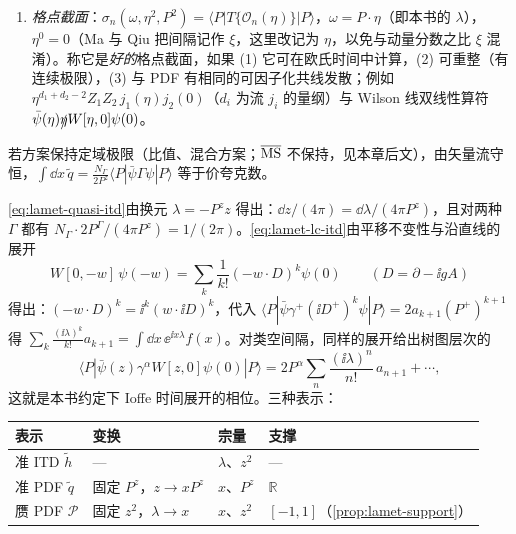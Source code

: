 \begin{definition}
\begin{enumerate}[label=(\roman*),leftmargin=2em,itemsep=1pt,topsep=2pt]
其中 $w=(0^+,w^-,\mathbf 0_{\mathrm T})$，$\lambda=P^+w^-$。
\item \emph{格点截面}\cite{MaQiu2018}：$\sigma_n(\omega,\eta^2,P^2)=\langle P|T\{\mathcal O_n(\eta)\}|P\rangle$，$\omega=P\cdot\eta$（即本书的 $\lambda$），$\eta^0=0$（Ma 与 Qiu 把间隔记作 $\xi$，这里改记为 $\eta$，以免与动量分数之比 $\xi$ 混淆）。称它是\emph{好的}格点截面，如果 (1) 它可在欧氏时间中计算，(2) 可重整（有连续极限），(3) 与 PDF 有相同的可因子化共线发散；例如 $\eta^{d_1+d_2-2}Z_1Z_2\,j_1(\eta)j_2(0)$（$d_i$ 为流 $j_i$ 的量纲）与 Wilson 线双线性算符 $\bar\psi(\eta)\slashed{\eta} W[\eta,0]\psi(0)$。
\end{enumerate}
若方案保持定域极限（比值、混合方案；$\overline{\mathrm{MS}}$ 不保持，见本章后文），由矢量流守恒，$\int\dd x\,\tilde q=\frac{N_\Gamma}{2P^z}\langle P|\bar\psi\Gamma\psi|P\rangle$ 等于价夸克数。
\end{definition}

\cref{eq:lamet-quasi-itd}由换元 $\lambda=-P^zz$ 得出：$\dd z/(4\pi)=\dd\lambda/(4\pi P^z)$，且对两种 $\Gamma$ 都有 $N_\Gamma\cdot2P^\Gamma/(4\pi P^z)=1/(2\pi)$。\cref{eq:lamet-lc-itd}由平移不变性与沿直线的展开
\[
W[0,-w]\,\psi(-w)=\sum_k\frac1{k!}(-w\cdot D)^k\psi(0)\qquad(D=\partial-\ii gA)
\]
得出：$(-w\cdot D)^k=\ii^k(w\cdot\ii D)^k$，代入 $\langle P|\bar\psi\gamma^+(\ii D^+)^k\psi|P\rangle=2a_{k+1}(P^+)^{k+1}$ 得 $\sum_k\frac{(\ii\lambda)^k}{k!}a_{k+1}=\int\dd x\,\ee^{\ii x\lambda}f(x)$。对类空间隔，同样的展开给出树图层次的
\[
\langle P|\bar\psi(z)\gamma^\alpha W[z,0]\psi(0)|P\rangle=2P^\alpha\sum_n\frac{(\ii\lambda)^n}{n!}\,a_{n+1}+\cdots,
\]
这就是本书约定下 Ioffe 时间展开的相位。三种表示：
\begin{center}
\small
\begin{tabular}{@{}llll@{}}
\toprule
表示 & 变换 & 宗量 & 支撑 \\
\midrule
准 ITD $\tilde h$ & — & $\lambda$、$z^2$ & — \\
准 PDF $\tilde q$ & 固定 $P^z$，$z\to xP^z$ & $x$、$P^z$ & $\mathbb R$ \\
赝 PDF $\mathcal P$ & 固定 $z^2$，$\lambda\to x$ & $x$、$z^2$ & $[-1,1]$（\cref{prop:lamet-support}） \\
\bottomrule
\end{tabular}
\end{center}

